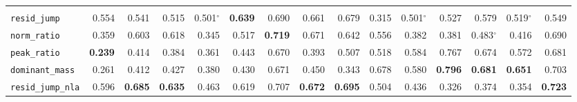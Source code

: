 \begin{table}[t]
\begin{tabular}{@{}lrrrrrrrrrrrrrr@{}}
\addlinespace
\multicolumn{15}{l}{\emph{activation}} \\
\texttt{resid\_jump} & \cellcolor[HTML]{D8E1EB}0.554 & \cellcolor[HTML]{DEE4EB}0.541 & \cellcolor[HTML]{E9EBEC}0.515 & \cellcolor[HTML]{EFEFEC}0.501$^{\circ}$ & \cellcolor[HTML]{B3CAE8}\textbf{0.639} & \cellcolor[HTML]{9DBDE6}0.690 & \cellcolor[HTML]{AAC4E7}0.661 & \cellcolor[HTML]{A2C0E6}0.679 & \cellcolor[HTML]{F2AEA6}0.315 & \cellcolor[HTML]{F0EFEC}0.501$^{\circ}$ & \cellcolor[HTML]{E4E8EB}0.527 & \cellcolor[HTML]{CDDAEA}0.579 & \cellcolor[HTML]{E8EAEC}0.519$^{\circ}$ & \cellcolor[HTML]{DAE2EB}0.549 \\
\texttt{norm\_ratio} & \cellcolor[HTML]{F3BDB6}0.359 & \cellcolor[HTML]{C3D4E9}0.603 & \cellcolor[HTML]{BCD0E9}0.618 & \cellcolor[HTML]{F3B9B1}0.345 & \cellcolor[HTML]{E8EAEC}0.517 & \cellcolor[HTML]{90B5E4}\textbf{0.719} & \cellcolor[HTML]{A5C2E7}0.671 & \cellcolor[HTML]{B2CAE8}0.642 & \cellcolor[HTML]{D7E0EB}0.556 & \cellcolor[HTML]{F3C6BF}0.382 & \cellcolor[HTML]{F3C5BF}0.381 & \cellcolor[HTML]{F1E9E5}0.483$^{\circ}$ & \cellcolor[HTML]{F3D2CC}0.416 & \cellcolor[HTML]{9DBDE6}0.690 \\
\texttt{peak\_ratio} & \cellcolor[HTML]{F0928A}\textbf{0.239} & \cellcolor[HTML]{F3D1CB}0.414 & \cellcolor[HTML]{F3C6C0}0.384 & \cellcolor[HTML]{F3BEB7}0.361 & \cellcolor[HTML]{F2DBD6}0.443 & \cellcolor[HTML]{A5C2E7}0.670 & \cellcolor[HTML]{F3C9C3}0.393 & \cellcolor[HTML]{EDEDEC}0.507 & \cellcolor[HTML]{E8EAEC}0.518 & \cellcolor[HTML]{CBD9EA}0.584 & \cellcolor[HTML]{7BA8E2}0.767 & \cellcolor[HTML]{A4C1E7}0.674 & \cellcolor[HTML]{D0DCEA}0.572 & \cellcolor[HTML]{A1BFE6}0.681 \\
\texttt{dominant\_mass} & \cellcolor[HTML]{F19A92}0.261 & \cellcolor[HTML]{F3D0CA}0.412 & \cellcolor[HTML]{F3D5D0}0.427 & \cellcolor[HTML]{F3C5BE}0.380 & \cellcolor[HTML]{F2D6D1}0.430 & \cellcolor[HTML]{A5C2E7}0.671 & \cellcolor[HTML]{F2DED9}0.450 & \cellcolor[HTML]{F3B8B0}0.343 & \cellcolor[HTML]{A2C0E6}0.678 & \cellcolor[HTML]{CDDAEA}0.580 & \cellcolor[HTML]{6FA0E0}\textbf{0.796} & \cellcolor[HTML]{A1BFE6}\textbf{0.681} & \cellcolor[HTML]{AEC7E8}\textbf{0.651} & \cellcolor[HTML]{97B9E5}0.703 \\
\texttt{resid\_jump\_nla} & \cellcolor[HTML]{C6D6EA}0.596 & \cellcolor[HTML]{9FBEE6}\textbf{0.685} & \cellcolor[HTML]{B5CBE8}\textbf{0.635} & \cellcolor[HTML]{F2E2DE}0.463 & \cellcolor[HTML]{BCD0E9}0.619 & \cellcolor[HTML]{96B8E5}0.707 & \cellcolor[HTML]{A5C2E7}\textbf{0.672} & \cellcolor[HTML]{9BBBE6}\textbf{0.695} & \cellcolor[HTML]{EEEEEC}0.504 & \cellcolor[HTML]{F2D9D4}0.436 & \cellcolor[HTML]{F3B2AA}0.326 & \cellcolor[HTML]{F3C3BC}0.374 & \cellcolor[HTML]{F3BCB5}0.354 & \cellcolor[HTML]{8FB4E4}\textbf{0.723} \\

\end{tabular}
\end{table}
